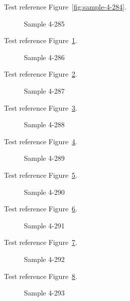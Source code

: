 Test reference Figure~\ref{fig:sample-4-284}.

\begin{figure}[tbhp]
\caption{Sample 4-285}
\label{fig:sample-4-285}
\end{figure}

Test reference Figure~\ref{fig:sample-4-285}.

\begin{figure}[tbhp]
\caption{Sample 4-286}
\label{fig:sample-4-286}
\end{figure}

Test reference Figure~\ref{fig:sample-4-286}.

\begin{figure}[tbhp]
\caption{Sample 4-287}
\label{fig:sample-4-287}
\end{figure}

Test reference Figure~\ref{fig:sample-4-287}.

\begin{figure}[tbhp]
\caption{Sample 4-288}
\label{fig:sample-4-288}
\end{figure}

Test reference Figure~\ref{fig:sample-4-288}.

\begin{figure}[tbhp]
\caption{Sample 4-289}
\label{fig:sample-4-289}
\end{figure}

Test reference Figure~\ref{fig:sample-4-289}.

\begin{figure}[tbhp]
\caption{Sample 4-290}
\label{fig:sample-4-290}
\end{figure}

Test reference Figure~\ref{fig:sample-4-290}.

\begin{figure}[tbhp]
\caption{Sample 4-291}
\label{fig:sample-4-291}
\end{figure}

Test reference Figure~\ref{fig:sample-4-291}.

\begin{figure}[tbhp]
\caption{Sample 4-292}
\label{fig:sample-4-292}
\end{figure}

Test reference Figure~\ref{fig:sample-4-292}.

\begin{figure}[tbhp]
\caption{Sample 4-293}
\label{fig:sample-4-293}
\end{figure}

